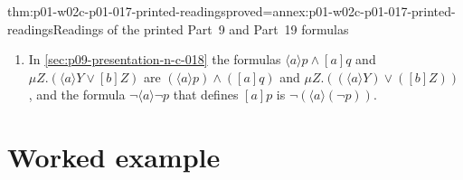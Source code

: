 \begin{hblemma}{thm:p01-w02c-p01-017-printed-readings}{proved=annex:p01-w02c-p01-017-printed-readings}{Readings of the printed Part~9 and Part~19 formulas}
\begin{enumerate}
\begin{align*}
   &(\langle\alpha\cup\beta\rangle X)\leftrightarrow
     ((\langle\alpha\rangle X)\lor(\langle\beta\rangle X)),\\
   &(\langle\alpha\rangle(X\lor Y))\leftrightarrow
     ((\langle\alpha\rangle X)\lor(\langle\alpha\rangle Y)),\\
   &(\langle\alpha;\beta\rangle X)\leftrightarrow
     (\langle\alpha\rangle(\langle\beta\rangle X)),\\
   &(\langle\alpha^{*}\rangle X)\leftrightarrow
     (X\lor(\langle\alpha\rangle(\langle\alpha^{*}\rangle X))),\\
   &(\langle\alpha^{*}\rangle X)\to
     (X\lor(\langle\alpha^{*}\rangle((\neg X)\land(\langle\alpha\rangle X)))).
  \end{align*}
  The formulas \(\langle a\rangle Q\lor\langle b\rangle Q\),
  \(\neg\langle a\rangle\neg Q\), \(C\land\langle a\rangle D\),
  \(Y\land\langle\beta\rangle\neg Y\) and
  \(\langle a\rangle A\to[a]A\) of the same section are
  \((\langle a\rangle Q)\lor(\langle b\rangle Q)\),
  \(\neg(\langle a\rangle(\neg Q))\), \(C\land(\langle a\rangle D)\),
  \(Y\land(\langle\beta\rangle(\neg Y))\) and
  \((\langle a\rangle A)\to([a]A)\).
\item In \cref{sec:p09-presentation-n-c-018} the formulas
  \(\langle a\rangle p\land[a]q\) and
  \(\mu Z.(\langle a\rangle Y\lor[b]Z)\) are
  \((\langle a\rangle p)\land([a]q)\) and
  \(\mu Z.((\langle a\rangle Y)\lor([b]Z))\), and the formula
  \(\neg\langle a\rangle\neg p\) that defines \([a]p\) is
  \(\neg(\langle a\rangle(\neg p))\).
\end{enumerate}
\end{hblemma}

\section{Worked example}
\label{sec:p01-w02c-p01-017-example}

